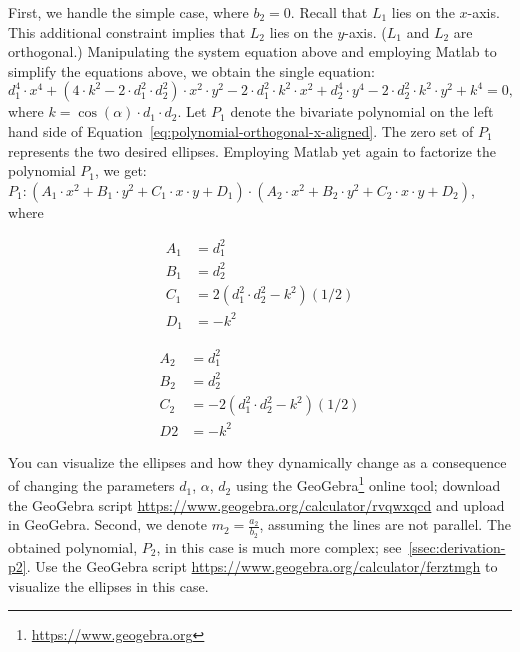 First, we handle the simple case, where $b_2 = 0$. Recall that $L_1$ lies on the $x$-axis. This additional constraint implies that $L_2$ lies on the $y$-axis. ($L_1$ and $L_2$ are orthogonal.) Manipulating the system equation above and employing Matlab to simplify the equations above, we obtain the single equation:
\begin{equation}
  d_1^4\cdot x^4 + (4\cdot k^2 - 2\cdot d_1^2\cdot d_2^2)\cdot x^2\cdot y^2 - 2\cdot d_1^2\cdot k^2\cdot x^2 + d_2^4\cdot y^4 - 2\cdot d_2^2\cdot k^2\cdot y^2 + k^4 = 0\label{eq:polynomial-orthogonal-x-aligned},
\end{equation}
where $k = \cos(\alpha)\cdot d_1\cdot d_2$. Let $P_1$ denote the bivariate polynomial on the left hand side of Equation~\ref{eq:polynomial-orthogonal-x-aligned}. The zero set of $P_1$ represents the two desired ellipses. Employing Matlab yet again to factorize the polynomial $P_1$, we get: $P_1: (A_1\cdot x^2 + B_1\cdot y^2 + C_1\cdot x\cdot y + D_1)\cdot (A_2\cdot x^2 + B_2\cdot y^2 + C_2\cdot x\cdot y +D_2)$, where
\begin{minipage}[c]{0.5\linewidth}
\begin{align*}
  A_1 &= d_1^2\\
  B_1 &= d_2^2\\
  C_1 &= 2(d_1^2\cdot d_2^2 - k^2)(1/2)\\
  D_1 &= -k^2
\end{align*}
\end{minipage}
\begin{minipage}[c]{0.5\linewidth}
\begin{align*}
  A_2 &= d_1^2\\
  B_2 &= d_2^2\\
  C_2 &= -2(d_1^2\cdot d_2^2 - k^2)(1/2)\\
  D2 &= -k^2
\end{align*}
\end{minipage}
You can visualize the ellipses and how they dynamically change as a
consequence of changing the parameters $d_1$, $\alpha$, $d_2$ using
the GeoGebra\footnote{\url{https://www.geogebra.org}} online tool;
download the GeoGebra script
\url{https://www.geogebra.org/calculator/rvqwxqcd} and upload in
GeoGebra. Second, we denote $m_2 = \frac{a_2}{b_2}$, assuming the
lines are not parallel. The obtained polynomial, $P_2$, in this case
is much more complex; see~\ref{ssec:derivation-p2}. Use the GeoGebra
script \url{https://www.geogebra.org/calculator/ferztmgh} to visualize
the ellipses in this case.
